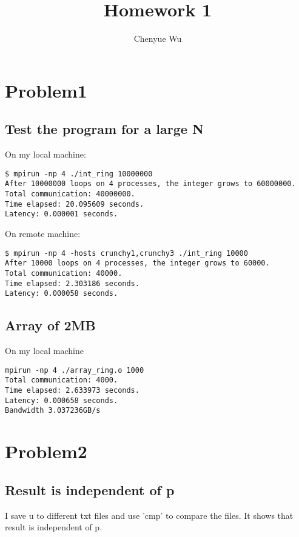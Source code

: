 \documentclass[11pt]{article} %
\title{Homework 1}
\author{Chenyue Wu}
\begin{document}
\maketitle

\section{Problem1}

\subsection{Test the program for a large N}

On my local machine:

\begin{lstlisting}
$ mpirun -np 4 ./int_ring 10000000
After 10000000 loops on 4 processes, the integer grows to 60000000.
Total communication: 40000000.
Time elapsed: 20.095609 seconds.
Latency: 0.000001 seconds.
\end{lstlisting}

On remote machine:
\begin{lstlisting}
$ mpirun -np 4 -hosts crunchy1,crunchy3 ./int_ring 10000
After 10000 loops on 4 processes, the integer grows to 60000.
Total communication: 40000.
Time elapsed: 2.303186 seconds.
Latency: 0.000058 seconds.

\end{lstlisting}

\subsection{Array of 2MB}
On my local machine

\begin{lstlisting}
mpirun -np 4 ./array_ring.o 1000
Total communication: 4000.
Time elapsed: 2.633973 seconds.
Latency: 0.000658 seconds.
Bandwidth 3.037236GB/s
\end{lstlisting}

\section{Problem2}

\subsection{Result is independent of p}
I save u to different txt files and use 'cmp' to compare the files. It shows that result is independent of p.
\end{document}

